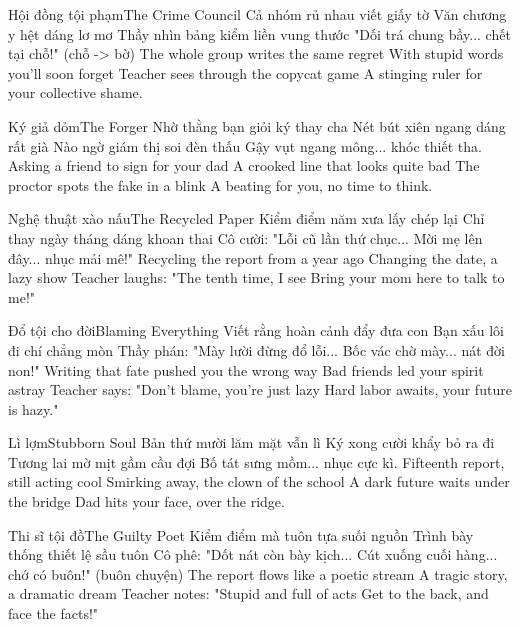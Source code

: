 \begin{tutuyetbox}{Hội đồng tội phạm}{The Crime Council}
Cả nhóm rủ nhau viết giấy tờ
Văn chương y hệt dáng lơ mơ
Thầy nhìn bảng kiểm liền vung thước
"Dối trá chung bầy... chết tại chỗ!" (chỗ -> bờ)
\tcblower
The whole group writes the same regret
With stupid words you'll soon forget
Teacher sees through the copycat game
A stinging ruler for your collective shame.
\end{tutuyetbox}

\begin{tutuyetbox}{Ký giả dỏm}{The Forger}
Nhờ thằng bạn giỏi ký thay cha
Nét bút xiên ngang dáng rất già
Nào ngờ giám thị soi đèn thấu
Gậy vụt ngang mông... khóc thiết tha.
\tcblower
Asking a friend to sign for your dad
A crooked line that looks quite bad
The proctor spots the fake in a blink
A beating for you, no time to think.
\end{tutuyetbox}

\begin{tutuyetbox}{Nghệ thuật xào nấu}{The Recycled Paper}
Kiểm điểm năm xưa lấy chép lại
Chỉ thay ngày tháng dáng khoan thai
Cô cười: "Lỗi cũ lần thứ chục...
Mời mẹ lên đây... nhục mải mê!"
\tcblower
Recycling the report from a year ago
Changing the date, a lazy show
Teacher laughs: "The tenth time, I see
Bring your mom here to talk to me!"
\end{tutuyetbox}

\begin{tutuyetbox}{Đổ tội cho đời}{Blaming Everything}
Viết rằng hoàn cảnh đẩy đưa con
Bạn xấu lôi đi chí chẳng mòn
Thầy phán: "Mày lười đừng đổ lỗi...
Bốc vác chờ mày... nát đời non!"
\tcblower
Writing that fate pushed you the wrong way
Bad friends led your spirit astray
Teacher says: "Don't blame, you're just lazy
Hard labor awaits, your future is hazy."
\end{tutuyetbox}

\begin{tutuyetbox}{Lì lợm}{Stubborn Soul}
Bản thứ mười lăm mặt vẫn lì
Ký xong cười khẩy bỏ ra đi
Tương lai mờ mịt gầm cầu đợi
Bố tát sưng mồm... nhục cực kì.
\tcblower
Fifteenth report, still acting cool
Smirking away, the clown of the school
A dark future waits under the bridge
Dad hits your face, over the ridge.
\end{tutuyetbox}

\begin{tutuyetbox}{Thi sĩ tội đồ}{The Guilty Poet}
Kiểm điểm mà tuôn tựa suối nguồn
Trình bày thống thiết lệ sầu tuôn
Cô phê: "Dốt nát còn bày kịch...
Cút xuống cuối hàng... chớ có buôn!" (buôn chuyện)
\tcblower
The report flows like a poetic stream
A tragic story, a dramatic dream
Teacher notes: "Stupid and full of acts
Get to the back, and face the facts!"
\end{tutuyetbox}

